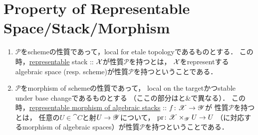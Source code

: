 \documentclass[a4paper, dvipdfmx]{jsarticle}
\begin{document}
\section{Property of Representable Space/Stack/Morphism}

\begin{Def}


    \enumfix
\begin{enumerate}
\item
    $\mathcal{P}$をschemeの性質であって，local for etale topologyであるものとする．
    この時，\underline{representable} stack :: $\mathcal{X}$が性質$\mathcal{P}$を持つとは，
    $\mathcal{X}$をrepresentするalgebraic space (resp. scheme)が性質$\mathcal{P}$を持つということである．

\item
    $\mathcal{P}$をmorphism of schemeの性質であって，
    local on the targetかつstable under base changeであるものとする
    （ここの部分は\cite{ASS}と\cite{Gomez}\&\cite{IrrOfMg}で異なる）．
    この時，\underline{representable morphism of algebraic stacks} :: $f \colon \mathscr{X} \to \mathscr{Y}$が
    性質$\mathcal{P}$を持つとは，
    任意の$U \in \cat{C}$と射$U \to \mathscr{Y}$について，
    $\operatorname{pr} \colon \mathscr{X} \times_{\mathscr{Y}} U \to U$
    （に対応するmorphism of algebraic spaces）が性質$\mathcal{P}$を持つということである．
\end{enumerate}
\end{Def}
\end{document}
